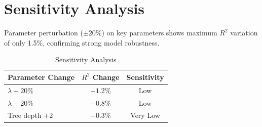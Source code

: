 \section{Sensitivity Analysis}


Parameter perturbation ($\pm 20\%$) on key parameters shows maximum $R^2$
variation of only 1.5\%, confirming strong model robustness.

\begin{table}[htbp]
\centering
\caption{Sensitivity Analysis}
\begin{tabular}{lcc}
\toprule
\textbf{Parameter Change} & \textbf{$R^2$ Change} & \textbf{Sensitivity} \\
\midrule
$\lambda + 20\%$ & $-1.2\%$ & Low \\
$\lambda - 20\%$ & $+0.8\%$ & Low \\
Tree depth $+2$  & $+0.3\%$ & Very Low \\
\bottomrule
\end{tabular}
\end{table}
